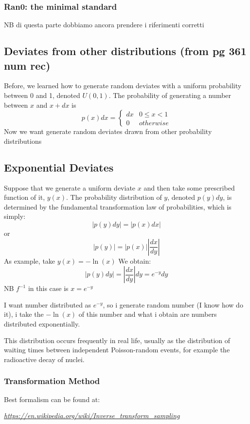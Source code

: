 \subsubsection{Ran0: the minimal standard}
NB di questa parte dobbiamo ancora prendere i riferimenti corretti

\subsection{Deviates from other distributions (from pg 361 num rec)}
Before, we learned how to generate random deviates with a uniform probability
between 0 and 1, denoted $U(0,1)$.
The probability of generating a number between
$x$ and $x+dx$ is
\[p(x)dx = \begin{cases}dx & 0 \le x < 1 \\ 0 & otherwise \end{cases}\]
Now we want generate random deviates drawn from other
probability distributions

\subsection{Exponential Deviates}
Suppose that we generate a uniform deviate $x$ and then take some prescribed
function of it, $y(x)$. The probability distribution of $y$, denoted $p(y)dy$, is determined
by the fundamental transformation law of probabilities, which is simply:
\[\left | p(y)dy \right |= \left | p(x)dx \right |\]
or 
\[\left | p(y)\right |= \left | p(x)\right | \left | \frac{dx}{dy} \right |\]
As example, take $y(x) = -\ln(x)$
We obtain:
\[\left | p(y)dy \right | = \left | \frac{dx}{dy} \right |dy = e^{-y}dy\]
NB $f^{-1}$ in this case is $x=e^{-y}$

I want number distributed as $e^{-y}$, so i generate random number (I know how do it), i take the $-\ln(x)$ of this number and what i obtain are numbers distributed exponentially. 

This distribution occurs frequently in real life, usually as the distribution of waiting times between independent Poisson-random events, for example the radioactive decay of nuclei.

\subsubsection{Transformation Method}
Best formalism can be found at:

\emph{\url{https://en.wikipedia.org/wiki/Inverse_transform_sampling}}


